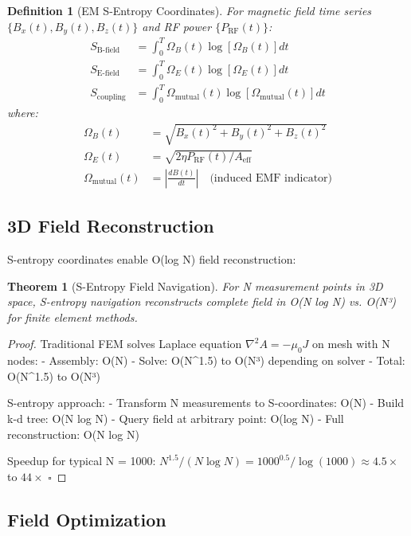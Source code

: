 \documentclass[12pt,a4paper]{article}
\newtheorem{theorem}{Theorem}
\newtheorem{definition}{Definition}
\begin{document}
\begin{definition}[EM S-Entropy Coordinates]
For magnetic field time series $\{B_x(t), B_y(t), B_z(t)\}$ and RF power $\{P_{\text{RF}}(t)\}$:
\begin{align}
S_{\text{B-field}} &= \int_0^T \Omega_B(t) \log[\Omega_B(t)] dt \\
S_{\text{E-field}} &= \int_0^T \Omega_E(t) \log[\Omega_E(t)] dt \\
S_{\text{coupling}} &= \int_0^T \Omega_{\text{mutual}}(t) \log[\Omega_{\text{mutual}}(t)] dt
\end{align}
where:
\begin{align}
\Omega_B(t) &= \sqrt{B_x(t)^2 + B_y(t)^2 + B_z(t)^2} \\
\Omega_E(t) &= \sqrt{2\eta P_{\text{RF}}(t) / A_{\text{eff}}} \\
\Omega_{\text{mutual}}(t) &= \left|\frac{dB(t)}{dt}\right| \quad \text{(induced EMF indicator)}
\end{align}
\end{definition}

\subsection{3D Field Reconstruction}

S-entropy coordinates enable O(log N) field reconstruction:

\begin{theorem}[S-Entropy Field Navigation]
For N measurement points in 3D space, S-entropy navigation reconstructs complete field in O(N log N) vs. O(N³) for finite element methods.
\end{theorem}

\begin{proof}
Traditional FEM solves Laplace equation $\nabla^2 A = -\mu_0 J$ on mesh with N nodes:
- Assembly: O(N)
- Solve: O(N^{1.5}) to O(N³) depending on solver
- Total: O(N^{1.5}) to O(N³)

S-entropy approach:
- Transform N measurements to S-coordinates: O(N)
- Build k-d tree: O(N log N)
- Query field at arbitrary point: O(log N)
- Full reconstruction: O(N log N)

Speedup for typical N = 1000: $N^{1.5} / (N \log N) = 1000^{0.5} / \log(1000) \approx 4.5\times$ to $44\times$ $\square$
\end{proof}

\subsection{Field Optimization}
\end{document}
